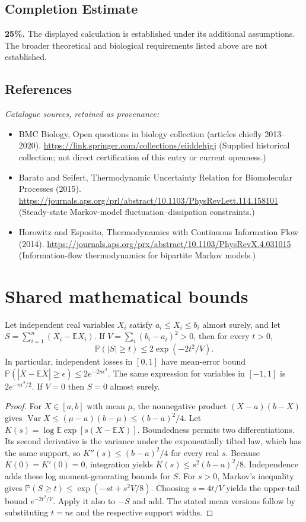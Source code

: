 \documentclass[11pt]{article}
\begin{document}
\subsection{Completion Estimate}
\textbf{25\%.} The displayed calculation is established under its additional assumptions. The broader theoretical and biological requirements listed above are not established.
\subsection{References}
\noindent\emph{Catalogue sources, retained as provenance:}
\begin{itemize}
\item BMC Biology, Open questions in biology collection (articles chiefly 2013--2020). \url{https://link.springer.com/collections/eiiddehjgj} (Supplied historical collection; not direct certification of this entry or current openness.)
\item Barato and Seifert, Thermodynamic Uncertainty Relation for Biomolecular Processes (2015). \url{https://journals.aps.org/prl/abstract/10.1103/PhysRevLett.114.158101} (Steady-state Markov-model fluctuation--dissipation constraints.)
\item Horowitz and Esposito, Thermodynamics with Continuous Information Flow (2014). \url{https://journals.aps.org/prx/abstract/10.1103/PhysRevX.4.031015} (Information-flow thermodynamics for bipartite Markov models.)
\end{itemize}




\section{Shared mathematical bounds}\label{app:bounds}
\begin{lemma}\label{lem:bounded}
Let independent real variables $X_i$ satisfy $a_i\leq X_i\leq b_i$ almost surely,
and let $S=\sum_{i=1}^n(X_i-\mathbb{E} X_i)$. If
$V=\sum_i(b_i-a_i)^2>0$, then for every $t>0$,
\[
 \mathbb{P}(|S|\geq t)\leq 2\exp(-2t^2/V).
\]
In particular, independent losses in $[0,1]$ have mean-error bound
$\mathbb{P}(|\overline X-\mathbb{E}\overline X|\geq\epsilon)
\leq2e^{-2n\epsilon^2}$. The same expression for variables in $[-1,1]$
is $2e^{-n\epsilon^2/2}$. If $V=0$ then $S=0$ almost surely.
\end{lemma}
\begin{proof}
For $X\in[a,b]$ with mean $\mu$, the nonnegative product
$(X-a)(b-X)$ gives
$\operatorname{Var} X\leq(\mu-a)(b-\mu)\leq(b-a)^2/4$.
Let $K(s)=\log\mathbb{E}\exp[s(X-\mathbb{E} X)]$.
Boundedness permits two differentiations. Its second derivative is the variance
under the exponentially tilted law, which has the same support, so
$K''(s)\leq(b-a)^2/4$ for every real $s$.
Because $K(0)=K'(0)=0$, integration yields
$K(s)\leq s^2(b-a)^2/8$.
Independence adds these log moment-generating bounds for $S$.
For $s>0$, Markov's inequality gives
$\mathbb{P}(S\geq t)\leq\exp(-st+s^2V/8)$.
Choosing $s=4t/V$ yields the upper-tail bound $e^{-2t^2/V}$.
Apply it also to $-S$ and add. The stated mean versions follow by substituting
$t=n\epsilon$ and the respective support widths.
\end{proof}
\end{document}
